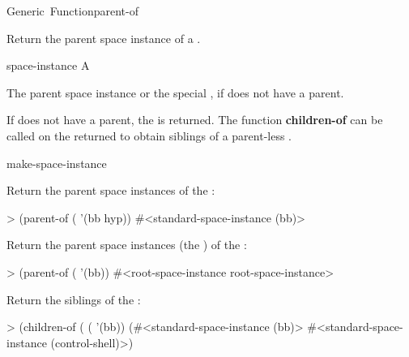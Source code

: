 \documentclass[10pt,twoside,english,pdftex]{article}
\begin{document}
\begin{functiondoc}{Generic~Function}{parent-of}%
  {
    \returns{} }
%

\fnsyntax

\fnpurpose Return the parent space instance of a .

\fnmethods
{}%
  {\code{(} 
    \returns{} }

\fnpackage {}

\fnmodule {}

\fnargs
\begin{args}{space-instance}
 A 
\end{args}

\fnreturns The parent space instance or the special
, if  does not have a
parent.

\fndescription If  does not have a parent, the
 is returned.  The function
\textbf{children-of} can be called on the returned
 to obtain siblings of a parent-less
.

\begin{alsos}{make-space-instance}
\also[children-of]
\end{alsos}

\fnexamples
{}%
%
Return the parent space instances of the  
:
%
\W\supp
\begin{example}
> (parent-of ( '(bb hyp))
#<standard-space-instance (bb)>
\end{example}
%
Return the parent space instances (the ) of
the  :
%
\W\supp\notpretop
\begin{example}
> (parent-of ( '(bb))
#<root-space-instance root-space-instance>
\end{example}
%
Return the siblings of the  :
%
\W\supp\notpretop
\begin{example}
> (children-of
    ( ( '(bb))
(#<standard-space-instance (bb)>
 #<standard-space-instance (control-shell)>)
\end{example}

\end{functiondoc}
\end{document}
